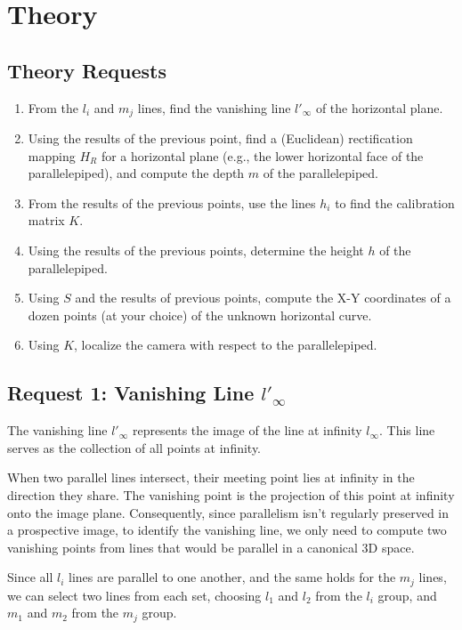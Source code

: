 \documentclass{Configuration_Files/PoliMi3i_thesis}
\begin{document}
\chapter{Theory}

\section*{Theory Requests}

\begin{enumerate}
    \item From the \( l_i \) and \( m_j \) lines, find the vanishing line \( l'_{\infty} \) of the horizontal plane.
    \item Using the results of the previous point, find a (Euclidean) rectification mapping \( H_R \) for a horizontal plane (e.g., the lower horizontal face of the parallelepiped), and compute the depth \( m \) of the parallelepiped.
    \item From the results of the previous points, use the lines \( h_i \) to find the calibration matrix \( K \).
    \item Using the results of the previous points, determine the height \( h \) of the parallelepiped.
    \item Using \( S \) and the results of previous points, compute the X-Y coordinates of a dozen points (at your choice) of the unknown horizontal curve.
    \item Using \( K \), localize the camera with respect to the parallelepiped.
\end{enumerate}

\newpage
\section{Request 1: Vanishing Line \( l'_\infty \)}

\noindent
The vanishing line \( l'_\infty \) represents the image of the line at infinity \( l_\infty \). This line serves as the collection of all points at infinity.

\noindent
When two parallel lines intersect, their meeting point lies at infinity in the direction they share. The vanishing point is the projection of this point at infinity onto the image plane. Consequently, since parallelism isn't regularly preserved in a prospective image, to identify the vanishing line, we only need to compute two vanishing points from lines that would be parallel in a canonical 3D space.

\noindent
Since all \( l_i \) lines are parallel to one another, and the same holds for the \( m_j \) lines, we can select two lines from each set, choosing \( l_1 \) and \( l_2 \) from the \( l_i \) group, and \( m_1 \) and \( m_2 \) from the \( m_j \) group.
\end{document}
